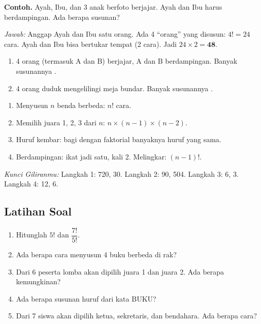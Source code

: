 \documentclass[11pt,a4paper]{article}
\begin{document}
\begin{contoh}
\textbf{Contoh.} Ayah, Ibu, dan 3 anak berfoto berjajar. Ayah dan Ibu harus berdampingan.
Ada berapa susunan?

\textit{Jawab:} Anggap Ayah dan Ibu satu orang. Ada 4 ``orang'' yang disusun: $4! = 24$ cara.
Ayah dan Ibu bisa bertukar tempat (2 cara). Jadi $24 \times 2 = \textbf{48}$.
\end{contoh}

\begin{giliranmu}
\begin{enumerate}[label=\alph*.]
    \item 4 orang (termasuk A dan B) berjajar, A dan B berdampingan. Banyak susunannya \kosong.
    \item 4 orang duduk mengelilingi meja bundar. Banyak susunannya \kosong.
\end{enumerate}
\end{giliranmu}

\begin{rangkuman}
\begin{enumerate}
    \item Menyusun $n$ benda berbeda: $n!$ cara.
    \item Memilih juara 1, 2, 3 dari $n$: $n \times (n-1) \times (n-2)$.
    \item Huruf kembar: bagi dengan faktorial banyaknya huruf yang sama.
    \item Berdampingan: ikat jadi satu, kali 2. Melingkar: $(n-1)!$.
\end{enumerate}
\end{rangkuman}

\textit{Kunci Giliranmu:} Langkah 1: 720, 30. \quad Langkah 2: 90, 504. \quad Langkah 3: 6, 3.
\quad Langkah 4: 12, 6.

\newpage
\subsection*{Latihan Soal}

\begin{enumerate}
  \item Hitunglah $5!$ dan $\dfrac{7!}{5!}$.
  \item Ada berapa cara menyusun 4 buku berbeda di rak?
  \item Dari 6 peserta lomba akan dipilih juara 1 dan juara 2. Ada berapa kemungkinan?
  \item Ada berapa susunan huruf dari kata BUKU?
  \item Dari 7 siswa akan dipilih ketua, sekretaris, dan bendahara. Ada berapa cara?
\end{enumerate}
\end{document}
